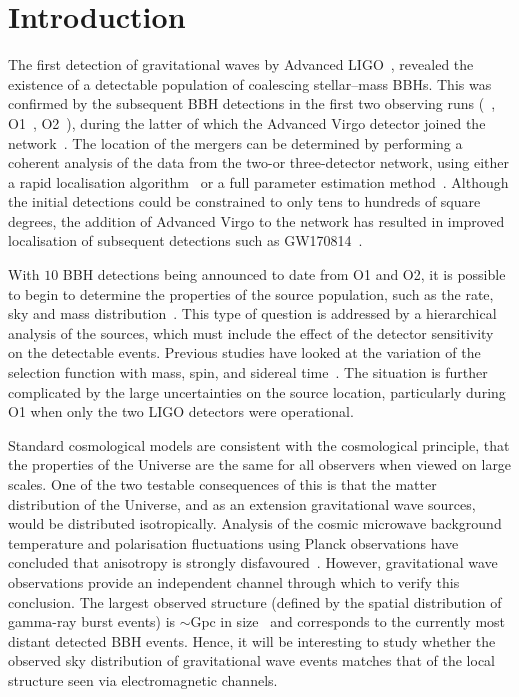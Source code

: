 \documentclass[usenatbib,useAMS]{mnras}
\begin{document}
\section{Introduction}
\label{sec:introduction}
%
The first detection of gravitational waves by Advanced LIGO~\citep{Aasi:2013wya,
aLIGO, Harry:2010zz, GW150914}, revealed the existence of a detectable
population of coalescing stellar--mass \acp{BBH}. This was confirmed by the
subsequent \ac{BBH} detections in the first two observing runs
(~\cite{O1O2catalog}, O1~\citep{O1BBH}, O2~\citep{GW170104,GW170608,GW170814}),
during the latter of which the Advanced Virgo detector joined the
network~\citep{AdVirgo}. The location of the mergers can be determined by
performing a coherent analysis of the data from the two-or three-detector
network, using either a rapid localisation algorithm~\citep{BAYESTAR} or a full
parameter estimation method~\citep{LALInference}. Although the initial
detections could be constrained to only tens to hundreds of square degrees, the
addition of Advanced Virgo to the network has resulted in improved localisation
of subsequent detections such as GW170814~\citep{GW170814}.

With $10$ \ac{BBH} detections being announced to date from O1 and O2, it is
possible to begin to determine the properties of the source population, such
as the rate, sky and mass
distribution~\citep{GW150914:RATES,O1BBH,O2populations}. This type of question
is addressed by a hierarchical analysis of the sources, which must include the
effect of the detector sensitivity on the detectable events. Previous studies
have looked at the variation of the selection function with mass, spin, and
sidereal time~\citep{PhysRevD.82.104006,2015ApJ...806..263D,
Ng:2018neg,Chen:2016luc}. The situation is further complicated by the large
uncertainties on the source location, particularly during O1 when only the two
LIGO detectors were operational.

Standard cosmological models are consistent with the cosmological principle,
that the properties of the Universe are the same for all observers when viewed
on large scales. One of the two testable consequences of this is that the 
matter distribution of the Universe, and as an extension gravitational wave sources,
would be distributed isotropically. Analysis of the cosmic microwave background
temperature and polarisation fluctuations using Planck observations have concluded
that anisotropy is strongly disfavoured~\citep{2016PhRvL.117m1302S}. However,
gravitational wave observations provide an independent channel through which to
verify this conclusion. The largest observed structure (defined by the spatial
distribution of gamma-ray burst events) is $\sim \mathrm{Gpc}$ in
size~\citep{2013arXiv1311.1104H} and corresponds to the
currently most distant detected \ac{BBH} events. Hence, it will be interesting
to study whether the observed sky distribution of gravitational wave events
matches that of the local structure seen via electromagnetic channels.
\end{document}
